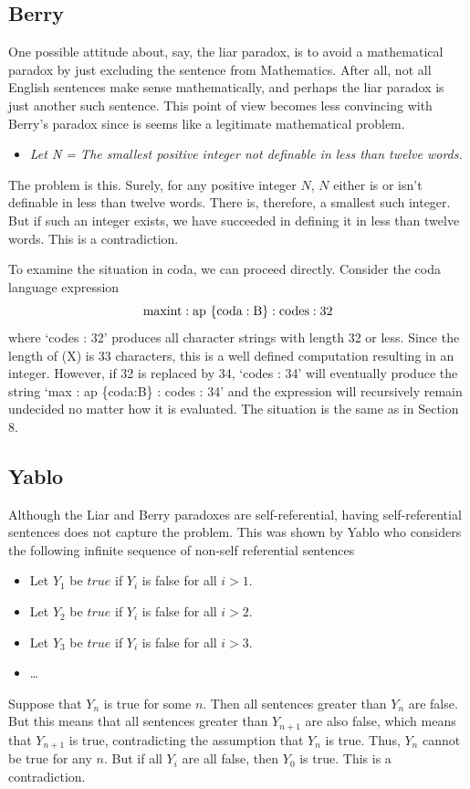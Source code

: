 \documentclass[11pt]{article}
\begin{document}
\subsection{Berry} 

     One possible attitude about, say, the liar paradox, is to avoid a mathematical paradox by just excluding 
the sentence  from Mathematics.  After all, not all English sentences make sense mathematically, and perhaps the liar paradox is just another such sentence.  This point of view becomes less convincing with Berry's paradox\cite{berry} since 
 is seems like a legitimate mathematical problem.  
 \begin{itemize}
 \item {\it Let N = The smallest positive integer not definable in less than twelve words.} 
 \end{itemize}
The problem is this.  Surely, for any positive integer $N$, $N$ either is or isn't definable in less than twelve words.  
There is, therefore, a smallest such integer.  But if such an integer exists, we have succeeded in defining it in 
less than twelve words.  This is a contradiction.  

     To examine the situation in coda, we can proceed directly.  Consider the coda language expression
\begin{equation}\label{eqn}
{\rm maxint : ap\ \{coda:B\} : codes : 32}
\end{equation}
where `codes : 32' produces all character strings with length 32 or less.  Since the length of (X) is 33 characters, 
this is a well defined computation resulting in an integer\cite{unrealistic}.  However, if 32 is replaced by 34, 
`codes : 34' will eventually produce the string `max : ap \{coda:B\} : codes : 34' and the expression will 
recursively remain undecided no matter how it is evaluated.  The situation is the same as in Section 8.  

\subsection{Yablo}

     Although the Liar and Berry paradoxes are self-referential, having self-referential sentences does not 
capture the problem.  This was shown by Yablo\cite{Yablo} who considers the following infinite sequence of non-self referential 
sentences
\begin{itemize}
\item Let $Y_1$ be $true$ if $Y_i$ is false for all $i>1$.
\item Let $Y_2$ be $true$ if $Y_i$ is false for all $i>2$.
\item Let $Y_3$ be $true$ if $Y_i$ is false for all $i>3$.
\item \dots
\end{itemize}
Suppose that $Y_n$ is true for some $n$.  Then all sentences greater than $Y_n$ are false.  But this means 
that all sentences greater than $Y_{n+1}$ are also false, which means that $Y_{n+1}$ is true, contradicting 
the assumption that $Y_n$ is true.  Thus, $Y_n$ cannot be true for any $n$.  But if all $Y_i$ are all false, then  
$Y_0$ is true.  This is a contradiction.  
\end{document}

